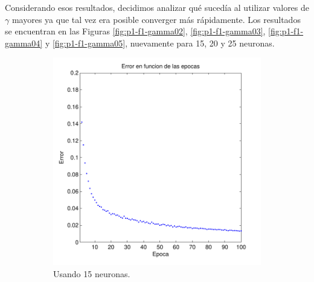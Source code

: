 \documentclass[informe.tex]{subfiles}
\begin{document}
    Considerando esos resultados, decidimos analizar qué sucedía al utilizar valores de $\gamma$ mayores ya que tal vez era posible converger más rápidamente. Los resultados se encuentran en las Figuras \ref{fig:p1-f1-gamma02}, \ref{fig:p1-f1-gamma03}, \ref{fig:p1-f1-gamma04} y \ref{fig:p1-f1-gamma05}, nuevamente para 15, 20 y 25 neuronas.
    
    \begin{figure}[H]
        \centering
        \begin{subfigure}[b]{0.32\textwidth}
                \includegraphics[width=\textwidth]{graficos/error_fold1_15_binary_100_02.pdf}
                \caption{Usando 15 neuronas.}
                \label{fig:d1-f1-02-n15}
        \end{subfigure}
        \begin{subfigure}[b]{0.32\textwidth}

\end{subfigure}
\end{figure}
\end{document}

